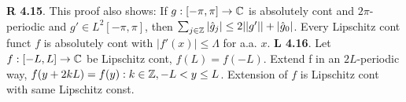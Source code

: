 {\bf R 4.15}. This proof also shows: If $g: [-\pi,\pi] \rightarrow \mathbb{C}$ is absolutely cont and $2\pi$-periodic and $g' \in L^2[-\pi,\pi]$, then $\sum_{j\in \mathbb{Z}}|\hat{g}_j|\leq 2||g'||+ |\hat{g}_0|$. Every Lipschitz cont funct $f$ is absolutely cont with $|f'(x)| \leq \Lambda$ for a.a. $x$. 
{\bf L 4.16}. Let $f: [-L,L]\rightarrow \mathbb{C}$ be Lipschitz cont, $f(L) = f(-L)$. Extend f in an $2L$-periodic way, $f(y+2kL)=f(y): k \in \mathbb{Z}, -L<y\leq L$. Extension of $f$ is Lipschitz cont with same Lipschitz const. 
